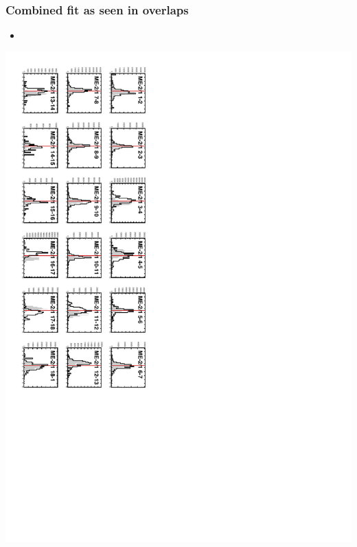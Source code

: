 \documentclass[compress]{beamer}
\begin{document}
\begin{frame}
\frametitle{Combined fit as seen in overlaps}
\small

\begin{itemize}
\item 

\end{itemize}

\includegraphics[height=\linewidth, angle=90]{final_checkresids_half.pdf}

\end{frame}





\begin{frame}
\label{numpages}
\end{frame}
\end{document}
